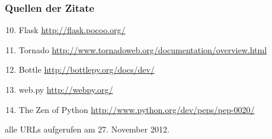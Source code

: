\documentclass[
    t,
    smaller,
    compress,
    xcolor=svgnames,            %
    table,
]{beamer}
\begin{document}
\begin{frame}
  \frametitle{Quellen der Zitate}
  \footnotesize
  \begin{enumerate}[<1->]
  \setcounter{enumi}{9}
    \item Flask
        \url{http://flask.pocoo.org/}
        \label{zit:1}
    \item Tornado
        \url{http://www.tornadoweb.org/documentation/overview.html}
        \label{zit:2}
    \item Bottle
        \url{http://bottlepy.org/docs/dev/}
        \label{zit:3}
    \item web.py
        \url{http://webpy.org/}
        \label{zit:4}
    \item The Zen of Python
        \url{http://www.python.org/dev/peps/pep-0020/}
        \label{zit:5}

  \end{enumerate}
  alle URLs aufgerufen am 27. November 2012.

\end{frame}
\end{document}
